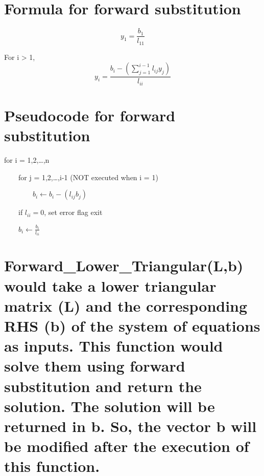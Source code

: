 \documentclass[11pt]{article}
\begin{document}
    \hypertarget{formula-for-forward-substitution}{%
\section{Formula for forward
substitution}\label{formula-for-forward-substitution}}

    \[y_1 = \frac{b_{1}}{l_{11}}\]

    For i \textgreater{} 1,
\[y_i = \frac{b_i - \left(\sum_{j = 1}^{i-1}l_{ij}y_{j}\right)}{l_{ii}}\]

    \hypertarget{pseudocode-for-forward-substitution}{%
\section{Pseudocode for forward
substitution}\label{pseudocode-for-forward-substitution}}

    for i = 1,2,\ldots{},n

    \(\qquad\)for j = 1,2,\ldots{},i-1 (NOT executed when i = 1)

    \(\qquad\)\(\qquad\)\(b_i\leftarrow b_i - (l_{ij}b_j)\)

    \(\qquad\)if \(l_{ii} = 0\), set error flag exit

    \(\qquad\)\(b_i\leftarrow \frac{b_i}{l_{ii}}\)

    \hypertarget{forward_lower_triangularlb-would-take-a-lower-triangular-matrix-l-and-the-corresponding-rhs-b-of-the-system-of-equations-as-inputs.-this-function-would-solve-them-using-forward-substitution-and-return-the-solution.-the-solution-will-be-returned-in-b.-so-the-vector-b-will-be-modified-after-the-execution-of-this-function.}{%
\section{Forward\_Lower\_Triangular(L,b) would take a lower triangular
matrix (L) and the corresponding RHS (b) of the system of equations as
inputs. This function would solve them using forward substitution and
return the solution. The solution will be returned in b. So, the vector
b will be modified after the execution of this
function.}\label{forward_lower_triangularlb-would-take-a-lower-triangular-matrix-l-and-the-corresponding-rhs-b-of-the-system-of-equations-as-inputs.-this-function-would-solve-them-using-forward-substitution-and-return-the-solution.-the-solution-will-be-returned-in-b.-so-the-vector-b-will-be-modified-after-the-execution-of-this-function.}}
\end{document}
